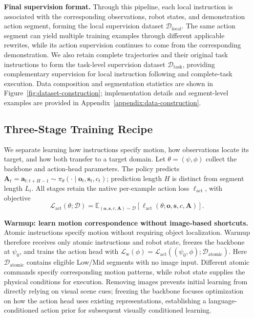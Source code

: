 \par
\endgroup

\textbf{Final supervision format.} Through this pipeline, each local instruction is associated with
the corresponding observations, robot states, and demonstration action segment, forming the local
supervision dataset $\mathcal D_{\mathrm{local}}$. The same action segment can yield multiple
training examples through different applicable rewrites, while its action supervision continues to
come from the corresponding demonstration. We also retain complete trajectories and their original
task instructions to form the task-level supervision dataset $\mathcal D_{\mathrm{task}}$,
providing complementary supervision for local instruction following and complete-task execution.
Data composition and segmentation statistics are shown in Figure~\ref{fig:dataset-construction};
implementation details and segment-level examples are provided in
Appendix~\ref{appendix:data-construction}.

\hypertarget{steering-centric-policy-training}{%
\subsection{Three-Stage Training Recipe}\label{steering-centric-policy-training}}

We separate learning how instructions specify motion, how observations locate its target, and how
both transfer to a target domain. Let $\theta=(\psi,\phi)$ collect
the backbone and action-head parameters. The policy predicts $\mathbf A_t=\mathbf
a_{t:t+H-1}\sim\pi_\theta(\cdot\mid\mathbf o_t,\mathbf s_t,c_t)$; prediction length $H$ is distinct
from segment length $L_i$. All stages retain the native per-example action loss
$\ell_{\mathrm{act}}$, with objective
\begin{equation}
\label{eq:action-objective}
\mathcal L_{\mathrm{act}}(\theta;\mathcal D)=
\mathbb E_{(\mathbf o,\mathbf s,c,\mathbf A)\sim\mathcal D}
\left[\ell_{\mathrm{act}}(\theta;\mathbf o,\mathbf s,c,\mathbf A)\right].
\end{equation}

\textbf{Warmup: learn motion correspondence without image-based shortcuts.} Atomic instructions
specify motion without requiring object localization. Warmup therefore receives only atomic
instructions and robot state, freezes the backbone at $\psi_0$, and trains the action head with
$\mathcal L_{\mathrm w}(\phi)=\mathcal L_{\mathrm{act}}((\psi_0,\phi);\mathcal
D_{\mathrm{atomic}})$. Here $\mathcal D_{\mathrm{atomic}}$ contains eligible Low/Mid segments with
no image input. Different atomic commands specify corresponding motion patterns, while robot state
supplies the physical conditions for execution. Removing images prevents initial learning from
directly relying on visual scene cues; freezing the backbone focuses optimization on how the action
head uses existing representations, establishing a language-conditioned action prior for subsequent
visually conditioned learning.

